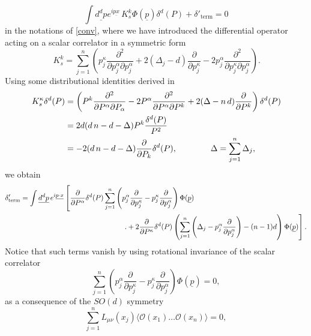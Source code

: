 \documentclass[a4paper,11pt,openright,twoside]{book}
\numberwithin{equation}{section}
\begin{document}
\begin{equation}
	\int \underline{d^d p}e^{i \underline{p x}}  \,K_s^k\Phi(\underline{p})\delta^d(P) +\delta'_\textrm{term}  =0
\end{equation}
in the notations of \eqref{conv}, where we have introduced the differential operator acting on a scalar correlator in a symmetric form
\begin{equation}
	\,K_s^k=\sum_{j=1}^n\left(p_j^\kappa \frac{\partial^2}{\partial p_j^\alpha\partial p_j^\alpha} + 2(\Delta_j- d)\frac{\partial}{\partial p_j^\kappa}-2 p_j^\alpha\frac{\partial^2}{\partial p_j^\kappa \partial p_j^\alpha}\right).
\end{equation}
Using some distributional identities derived in \cite{Coriano:2018bbe}
\begin{align}
	\label{uno}
	\,K_s^\kappa \delta^d(P)&=\left(P^k\frac{\partial^2}{\partial P^\alpha \partial P_\alpha}  -2 P^\alpha \frac{\partial^2}{\partial P^\alpha\partial P^k} 
	+2 (\Delta- n\, d)\frac{\partial }{\partial P^k}\right)\delta^d(P)\notag\\
	&=2 d( d \,n -  d -\Delta)P^k\frac{\delta^d(P)}{P^2}\notag\\
	&=-2 ( d \,n -  d -\Delta)\frac{\partial}{\partial P_k} {\delta^d(P)},
	\qquad \qquad \Delta=\sum_{j=1}^n\Delta_j,
\end{align}
we obtain
\begin{align}
	\delta'_\textrm{term}&= \int {\underline{d^d p}}\,e^{i\underline{p\cdot x}}
	\left[ \frac{\partial}{\partial P^\alpha} \delta^d(P)\sum_{j=1}^n\left(p_j^\alpha\frac{\partial}{\partial p_j^\kappa}- p_j^\kappa\frac{\partial}{\partial p_j^\alpha}\right)\Phi(\underline{p}) \right.\notag\\
	&\hspace{5cm}\left..+ 2 \frac{\partial}{\partial P^\kappa} \delta^d(P)\left(\sum_{j=1}^n\left (\Delta_j -  p_j^\alpha 
	\frac{\partial}{\partial p_j^\alpha} \right)- (n-1) d \right)\Phi(\underline{p})\right].
\end{align}
Notice that such terms vanish \cite{Coriano:2018bbe} by using rotational invariance of the scalar correlator 
\begin{equation}
	\sum_{j=1}^n\left(p_j^\alpha\frac{\partial}{\partial p_j^\kappa}- p_j^\kappa\frac{\partial}{\partial p_j^\alpha}\right)\Phi(\underline{p})=0,
\end{equation}
as a consequence of the $SO(d)$ symmetry 
\begin{equation}
	\sum_{j=1}^n L_{\mu\nu}(x_j) \langle \mathcal{O}(x_1)\dots\mathcal{O}(x_n)\rangle =0, 
\end{equation}
\end{document}
